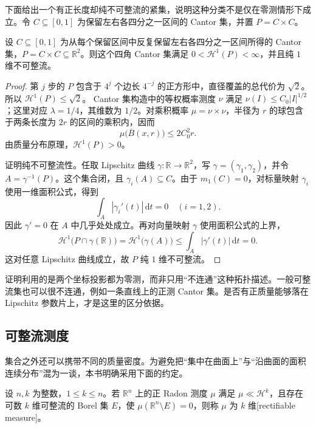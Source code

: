 下面给出一个有正长度却纯不可整流的紧集，说明这种分类不是仅在零测情形下成立。令 \(C\subseteq[0,1]\) 为保留左右各四分之一区间的 Cantor 集，并置 \(P=C\times C\)。

\begin{proposition}\label{b1:prop:four-corner-pure-unrectifiable}
设 \(C\subseteq[0,1]\) 为从每个保留区间中反复保留左右各四分之一区间所得的 Cantor 集，\(P=C\times C\subseteq\mathbb R^2\)。则这个四角 Cantor 集满足 \(0<\mathcal H^1(P)<\infty\)，并且纯 \(1\) 维不可整流。
\end{proposition}
\begin{proof}
第 \(j\) 步的 \(P\) 包含于 \(4^j\) 个边长 \(4^{-j}\) 的正方形中，直径覆盖的总代价为 \(\sqrt2\)。所以 \(\mathcal H^1(P)\leq\sqrt2\)。 Cantor 集构造中的等权概率测度 \(\nu\) 满足 \(\nu(I)\leq C_0|I|^{1/2}\)；这里对应 \(\lambda=1/4\)，其维数为 \(1/2\)。对乘积概率 \(\mu=\nu\times\nu\)，半径为 \(r\) 的球包含于两条长度为 \(2r\) 的区间的乘积内，因而
\[
 \mu\bigl(\overline B(x,r)\bigr)\leq2C_0^2r.
\]
由质量分布原理，\(\mathcal H^1(P)>0\)。

证明纯不可整流性。任取 Lipschitz 曲线 \(\gamma:\mathbb R\to\mathbb R^2\)，写 \(\gamma=(\gamma_1,\gamma_2)\)，并令 \(A=\gamma^{-1}(P)\)。这个集合闭，且 \(\gamma_i(A)\subseteq C\)。由于 \(m_1(C)=0\)，对标量映射 \(\gamma_i\) 使用一维面积公式，得到
\[
 \int_A|\gamma_i'(t)|\,\mathrm dt=0\quad(i=1,2).
\]
因此 \(\gamma'=0\) 在 \(A\) 中几乎处处成立。再对向量映射 \(\gamma\) 使用面积公式的上界，
\[
 \mathcal H^1\bigl(P\cap\gamma(\mathbb R)\bigr)
 =\mathcal H^1\bigl(\gamma(A)\bigr)
 \leq\int_A|\gamma'(t)|\,\mathrm dt=0.
\]
这对任意 Lipschitz 曲线成立，故 \(P\) 纯 \(1\) 维不可整流。
\end{proof}

证明利用的是两个坐标投影都为零测，而非只用“不连通”这种拓扑描述。一般可整流集也可以很不连通，例如一条直线上的正测 Cantor 集。是否有正质量能够落在 Lipschitz 参数片上，才是这里的区分依据。

\subsection{可整流测度}
\label{b1:subsec:190104}

集合之外还可以携带不同的质量密度。为避免把“集中在曲面上”与“沿曲面的面积连续分布”混为一谈，本书明确采用下面的约定。

\begin{definition}\label{b1:def:rectifiable-measure}
设 \(n,k\) 为整数，\(1\leq k\leq n\)。若 \(\mathbb R^n\) 上的正 Radon 测度 \(\mu\) 满足 \(\mu\ll\mathcal H^k\)，且存在可数 \(k\) 维可整流的 Borel 集 \(E\)，使 \(\mu(\mathbb R^n\setminus E)=0\)，则称 \(\mu\) 为 \(k\) 维[rectifiable measure]。
\end{definition}

